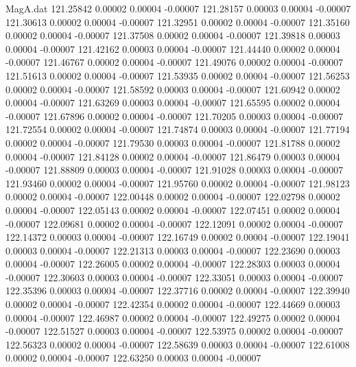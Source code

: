 \begin{filecontents}{MagA.dat}
 121.25842    0.00002    0.00004   -0.00007
 121.28157    0.00003    0.00004   -0.00007
 121.30613    0.00002    0.00004   -0.00007
 121.32951    0.00002    0.00004   -0.00007
 121.35160    0.00002    0.00004   -0.00007
 121.37508    0.00002    0.00004   -0.00007
 121.39818    0.00003    0.00004   -0.00007
 121.42162    0.00003    0.00004   -0.00007
 121.44440    0.00002    0.00004   -0.00007
 121.46767    0.00002    0.00004   -0.00007
 121.49076    0.00002    0.00004   -0.00007
 121.51613    0.00002    0.00004   -0.00007
 121.53935    0.00002    0.00004   -0.00007
 121.56253    0.00002    0.00004   -0.00007
 121.58592    0.00003    0.00004   -0.00007
 121.60942    0.00002    0.00004   -0.00007
 121.63269    0.00003    0.00004   -0.00007
 121.65595    0.00002    0.00004   -0.00007
 121.67896    0.00002    0.00004   -0.00007
 121.70205    0.00003    0.00004   -0.00007
 121.72554    0.00002    0.00004   -0.00007
 121.74874    0.00003    0.00004   -0.00007
 121.77194    0.00002    0.00004   -0.00007
 121.79530    0.00003    0.00004   -0.00007
 121.81788    0.00002    0.00004   -0.00007
 121.84128    0.00002    0.00004   -0.00007
 121.86479    0.00003    0.00004   -0.00007
 121.88809    0.00003    0.00004   -0.00007
 121.91028    0.00003    0.00004   -0.00007
 121.93460    0.00002    0.00004   -0.00007
 121.95760    0.00002    0.00004   -0.00007
 121.98123    0.00002    0.00004   -0.00007
 122.00448    0.00002    0.00004   -0.00007
 122.02798    0.00002    0.00004   -0.00007
 122.05143    0.00002    0.00004   -0.00007
 122.07451    0.00002    0.00004   -0.00007
 122.09681    0.00002    0.00004   -0.00007
 122.12091    0.00002    0.00004   -0.00007
 122.14372    0.00003    0.00004   -0.00007
 122.16749    0.00002    0.00004   -0.00007
 122.19041    0.00003    0.00004   -0.00007
 122.21313    0.00003    0.00004   -0.00007
 122.23690    0.00003    0.00004   -0.00007
 122.26005    0.00002    0.00004   -0.00007
 122.28303    0.00003    0.00004   -0.00007
 122.30603    0.00003    0.00004   -0.00007
 122.33051    0.00003    0.00004   -0.00007
 122.35396    0.00003    0.00004   -0.00007
 122.37716    0.00002    0.00004   -0.00007
 122.39940    0.00002    0.00004   -0.00007
 122.42354    0.00002    0.00004   -0.00007
 122.44669    0.00003    0.00004   -0.00007
 122.46987    0.00002    0.00004   -0.00007
 122.49275    0.00002    0.00004   -0.00007
 122.51527    0.00003    0.00004   -0.00007
 122.53975    0.00002    0.00004   -0.00007
 122.56323    0.00002    0.00004   -0.00007
 122.58639    0.00003    0.00004   -0.00007
 122.61008    0.00002    0.00004   -0.00007
 122.63250    0.00003    0.00004   -0.00007

\end{filecontents}
